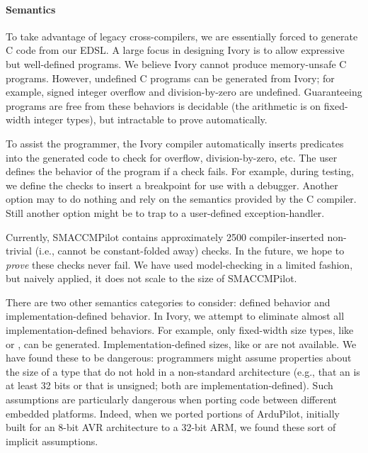 
\paragraph{Semantics}
To take advantage of legacy cross-compilers, we are essentially forced to
generate C code from our EDSL.  A large focus in designing Ivory is to allow
expressive but well-defined programs.  We believe Ivory
cannot produce memory-unsafe C programs.  However, undefined C programs can be
generated from Ivory; for example, signed integer overflow and division-by-zero
are undefined.  Guaranteeing programs are free from these behaviors is decidable
(the arithmetic is on fixed-width integer types), but intractable to prove
automatically.

To assist the programmer, the Ivory compiler automatically inserts predicates
into the generated code to check for overflow, division-by-zero, etc.  The user
defines the behavior of the program if a check fails.  For example, during
testing, we define the checks to insert a breakpoint for use with a debugger.
Another option may to do nothing and rely on the semantics provided by the C
compiler.  Still another option might be to trap to a user-defined
exception-handler.

Currently, SMACCMPilot contains approximately 2500 compiler-inserted non-trivial
(i.e., cannot be constant-folded away) checks.  In the future, we hope to
\emph{prove} these checks never fail.  We have used model-checking in a limited
fashion, but naively applied, it does not scale to the size of SMACCMPilot.

There are two other semantics categories to consider: defined behavior and
implementation-defined behavior.  In Ivory, we attempt to eliminate almost all
implementation-defined behaviors.  For example, only fixed-width size types,
like  or , can be generated.  Implementation-defined
sizes, like  or  are not available.  We have found these to be
dangerous: programmers might assume properties about the size of a type that do not
hold in a non-standard architecture (e.g., that an  is at least 32 bits
or that  is unsigned; both are implementation-defined).  Such
assumptions are particularly dangerous when porting code between different
embedded platforms.  Indeed, when we ported portions of ArduPilot, initially built
for an 8-bit AVR architecture to a 32-bit ARM, we found these sort of implicit
assumptions.

